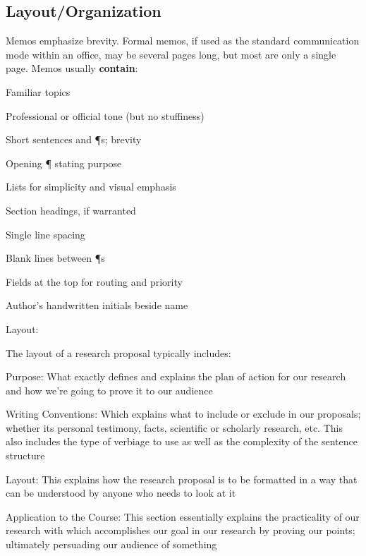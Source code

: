 \documentclass[10pt, oneside]{texMemo}	%
\begin{document}
\subsection*{Layout/Organization} %
\label{sec:purpose}
Memos emphasize brevity. Formal memos, if used as the standard communication mode within an office, may be several pages long, but most are only a single page. Memos usually \textbf{contain}:
\begin{multicols}{2}
	\begin{itemize*}
		\item Familiar topics
		\item Professional or official tone (but no stuffiness)
		\item Short sentences and ¶s; brevity
		\item Opening ¶ stating purpose
		\item Lists for simplicity and visual emphasis
		\item Section headings, if warranted
		\item Single line spacing
		\item Blank lines between ¶s
		\item Fields at the top for routing and priority
		\item Author's handwritten initials beside name
	\end{itemize*}

	
	Layout:

The layout of a research proposal typically includes:


Purpose: What exactly defines and explains the plan of action for our research and how we’re going to prove it to our audience

Writing Conventions: Which explains what to include or exclude in our proposals; whether its personal testimony, facts, scientific or scholarly research, etc. This also includes the type of verbiage to use as well as the complexity of the sentence structure

Layout: This explains how the research proposal is to be formatted in a way that can be understood by anyone who needs to look at it

Application to the Course: This section essentially explains the practicality of our research with which accomplishes our goal in our research by proving our points; ultimately persuading our audience of something

\end{multicols}
\end{document}
